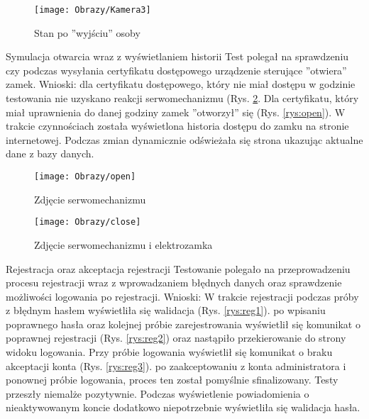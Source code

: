 \begin{enumerate*}
	\begin{figure}[ht!]
		\vspace{-1.7cm}
		\centering
		\texttt{[image: Obrazy/Kamera3]}
		\caption{Stan po ''wyjściu'' osoby}
		\label{rys:Kamera3}
	\end{figure}
\newpage
	\item Symulacja otwarcia wraz z wyświetlaniem historii 
	Test polegał na sprawdzeniu czy podczas wysyłania certyfikatu dostępowego urządzenie sterujące ''otwiera'' zamek.
	Wnioski: dla certyfikatu dostępowego, który nie miał dostępu w godzinie testowania nie uzyskano reakcji serwomechanizmu (Rys. \ref{rys:close}. Dla certyfikatu, który miał uprawnienia do danej godziny zamek ''otworzył'' się (Rys. \ref{rys:open}). W trakcie  czynnościach została wyświetlona historia dostępu do zamku na stronie internetowej. Podczas zmian dynamicznie odświeżała się strona ukazując aktualne dane z bazy danych. 
		\begin{figure}[ht!]
		\centering
		\begin{minipage}{0.5\textwidth}
			\texttt{[image: Obrazy/open]}
			\caption{Zdjęcie serwomechanizmu }
			\label{rys:open}
		\end{minipage}
	\begin{minipage}{0.5\textwidth}
		\texttt{[image: Obrazy/close]}
		\caption{Zdjęcie serwomechanizmu i elektrozamka }
		\label{rys:close}
	\end{minipage}
	\end{figure}

	\item Rejestracja oraz akceptacja rejestracji
	Testowanie polegało na przeprowadzeniu procesu rejestracji wraz z wprowadzaniem błędnych danych oraz sprawdzenie możliwości logowania po rejestracji.
	Wnioski: W trakcie rejestracji podczas próby z błędnym hasłem wyświetliła się walidacja (Rys. \ref{rys:reg1}). po wpisaniu poprawnego hasła oraz kolejnej próbie zarejestrowania wyświetlił się komunikat o poprawnej rejestracji (Rys. \ref{rys:reg2}) oraz nastąpiło przekierowanie do strony widoku logowania. Przy próbie logowania wyświetlił się komunikat o braku akceptacji konta (Rys. \ref{rys:reg3}). po zaakceptowaniu z konta administratora i ponownej próbie logowania, proces ten został pomyślnie sfinalizowany. Testy przeszły niemalże pozytywnie. Podczas wyświetlenie powiadomienia o nieaktywowanym koncie dodatkowo niepotrzebnie wyświetliła się walidacja hasła.   
	

\end{enumerate*}
